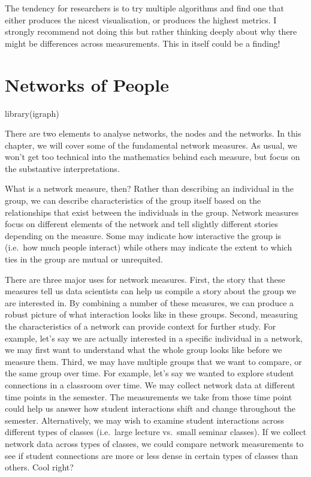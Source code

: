 \documentclass[
  letterpaper,
  DIV=11,
  numbers=noendperiod]{scrreprt}
\newenvironment{Shaded}{\begin{snugshade}}{\end{snugshade}}
\newcommand{\FunctionTok}[1]{\textcolor[rgb]{0.28,0.35,0.67}{#1}}
\newcommand{\NormalTok}[1]{\textcolor[rgb]{0.00,0.23,0.31}{#1}}
\begin{document}
The tendency for researchers is to try multiple algorithms and find one
that either produces the nicest visualisation, or produces the highest
metrics. I strongly recommend not doing this but rather thinking deeply
about why there might be differences across measurements. This in itself
could be a finding!

\chapter{Networks of People}\label{networks-of-people}

\begin{Shaded}
\begin{Highlighting}[]
\FunctionTok{library}\NormalTok{(igraph)}
\end{Highlighting}
\end{Shaded}

There are two elements to analyse networks, the nodes and the networks.
In this chapter, we will cover some of the fundamental network measures.
As usual, we won't get too technical into the mathematics behind each
measure, but focus on the substantive interpretations.

What is a network measure, then? Rather than describing an individual in
the group, we can describe characteristics of the group itself based on
the relationships that exist between the individuals in the group.
Network measures focus on different elements of the network and tell
slightly different stories depending on the measure. Some may indicate
how interactive the group is (i.e.~how much people interact) while
others may indicate the extent to which ties in the group are mutual or
unrequited.

There are three major uses for network measures. First, the story that
these measures tell us data scientists can help us compile a story about
the group we are interested in. By combining a number of these measures,
we can produce a robust picture of what interaction looks like in these
groups. Second, measuring the characteristics of a network can provide
context for further study. For example, let's say we are actually
interested in a specific individual in a network, we may first want to
understand what the whole group looks like before we measure them.
Third, we may have multiple groups that we want to compare, or the same
group over time. For example, let's say we wanted to explore student
connections in a classroom over time. We may collect network data at
different time points in the semester. The measurements we take from
those time point could help us answer how student interactions shift and
change throughout the semester. Alternatively, we may wish to examine
student interactions across different types of classes (i.e.~large
lecture vs.~small seminar classes). If we collect network data across
types of classes, we could compare network measurements to see if
student connections are more or less dense in certain types of classes
than others. Cool right?
\end{document}
